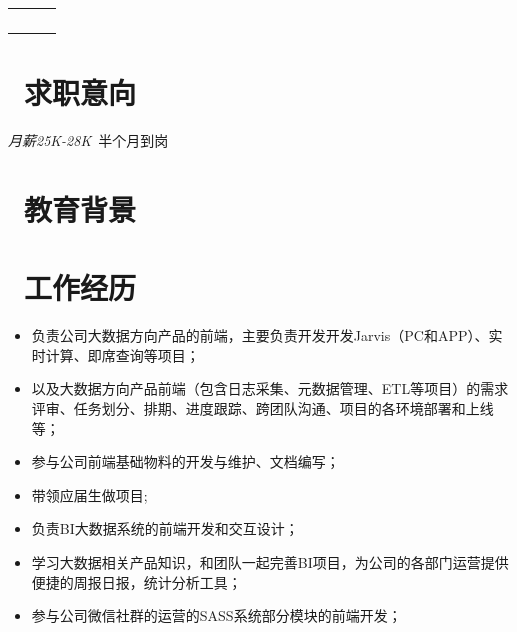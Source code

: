 \documentclass{resume}
\begin{document}

\Large{
  \begin{tabu}{ l r r }
    &  &  \\
    &  &  \\
    &  &  \\
    &  & 
  \end{tabu}
}

\normalsize
\section{\faInfo\  求职意向}
\textit{月薪25K-28K}\ 半个月到岗

\section{\faGraduationCap\  教育背景}

\section{\faGraduationCap\  工作经历}

\begin{onehalfspacing}
\begin{itemize}
  \item 负责公司大数据方向产品的前端，主要负责开发开发Jarvis（PC和APP）、实时计算、即席查询等项目；
  \item 以及大数据方向产品前端（包含日志采集、元数据管理、ETL等项目）的需求评审、任务划分、排期、进度跟踪、跨团队沟通、项目的各环境部署和上线等；
  \item 参与公司前端基础物料的开发与维护、文档编写；
  \item 带领应届生做项目;
\end{itemize}
\end{onehalfspacing}

\begin{onehalfspacing}
\begin{itemize}
  \item 负责BI大数据系统的前端开发和交互设计；
  \item 学习大数据相关产品知识，和团队一起完善BI项目，为公司的各部门运营提供便捷的周报日报，统计分析工具；
  \item 参与公司微信社群的运营的SASS系统部分模块的前端开发；
\end{itemize}
\end{onehalfspacing}
\end{document}
